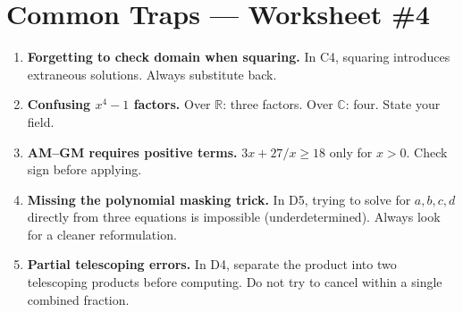 \documentclass[11pt,a4paper]{article}
\begin{document}
\section*{Common Traps --- Worksheet \#4}
\begin{enumerate}[leftmargin=2em,itemsep=4pt]
  \item \textbf{Forgetting to check domain when squaring.} In C4, squaring introduces extraneous solutions. Always substitute back. 
  \item \textbf{Confusing $x^4-1$ factors.} Over $\mathbb{R}$: three factors. Over $\mathbb{C}$: four. State your field. 
  \item \textbf{AM--GM requires positive terms.} $3x+27/x\geq18$ only for $x>0$. Check sign before applying. 
  \item \textbf{Missing the polynomial masking trick.} In D5, trying to solve for $a,b,c,d$ directly from three equations is impossible (underdetermined). Always look for a cleaner reformulation. 
  \item \textbf{Partial telescoping errors.} In D4, separate the product into two telescoping products before computing. Do not try to cancel within a single combined fraction. 
\end{enumerate}

\end{document}
